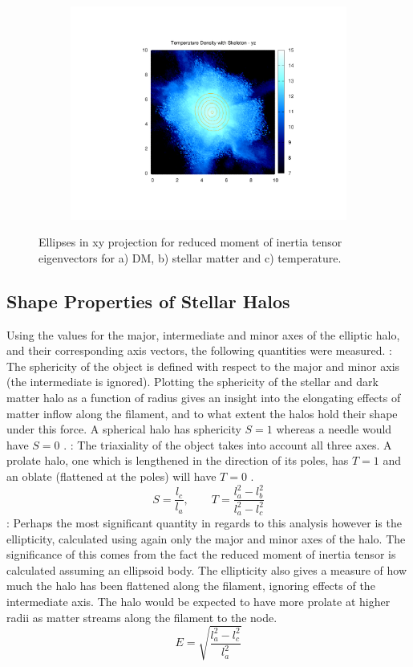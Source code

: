 \documentclass[journal]{IEEEtran}
\begin{document}
\begin{figure}[!t]
\begin{subfigure}[t]{0.3\textwidth}
		\includegraphics[width=\linewidth]{TempDenEllipyz.pdf}
	\end{subfigure}
\label{fig:ellipses}
\caption{Ellipses in xy projection for reduced moment of inertia tensor eigenvectors for a) DM, b) stellar matter and c) temperature.}
\end{figure}

\subsection{Shape Properties of Stellar Halos}
Using the values for the major, intermediate and minor axes of the elliptic halo, and their corresponding axis vectors, the following quantities were measured. 
: The sphericity of the object is defined with respect to the major and minor axis (the intermediate is ignored). Plotting the sphericity of the stellar and dark matter halo as a function of radius gives an insight into the elongating effects of matter inflow along the filament, and to what extent the halos hold their shape under this force. A spherical halo has sphericity $S=1$ whereas a needle would have $S=0$ \cite{hahn07a}.
: The triaxiality of the object takes into account all three axes. A prolate halo, one which is lengthened in the direction of its poles, has $T=1$ and an oblate (flattened at the poles) will have $T=0$ \cite{hahn07a}.
\begin{equation}
	S=\frac{l_c}{l_a}, \quad \quad T=\frac{l_a^2-l_b^2}{l_a^2-l_c^2}
	\label{eq:sph&tri}
\end{equation}
: Perhaps the most significant quantity in regards to this analysis however is the ellipticity, calculated using again only the major and minor axes of the halo. The significance of this comes from the fact the reduced moment of inertia tensor is calculated assuming an ellipsoid body. The ellipticity also gives a measure of how much the halo has been flattened along the filament, ignoring effects of the intermediate axis. The halo would be expected to have more prolate at higher radii as matter streams along the filament to the node.
\begin{equation}
	E=\sqrt{\frac{l_a^2-l_c^2}{l_a^2}}
	\label{eq:ellipticity}
\end{equation}
\end{document}
